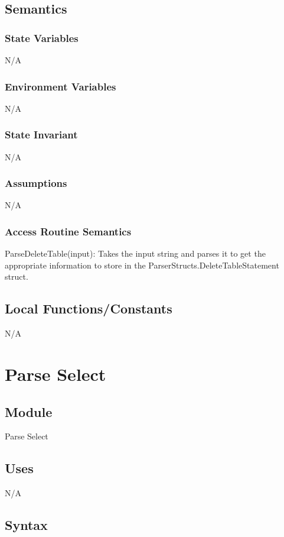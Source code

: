 \documentclass[12pt]{article}
\begin{document}
\subsection{Semantics}
\subsubsection{State Variables}
N/A

\subsubsection{Environment Variables}
N/A

\subsubsection{State Invariant}
N/A

\subsubsection{Assumptions}
N/A

\subsubsection{Access Routine Semantics}
{\color{red} \noindent ParseDeleteTable(input): Takes the input string and parses it to get the appropriate information to store in the ParserStructs.DeleteTableStatement struct.\\}


\subsection{Local Functions/Constants}
N/A

\newpage

\section{Parse Select}

\subsection{Module}
Parse Select

\subsection {Uses}
N/A

\subsection {Syntax}
\end{document}
